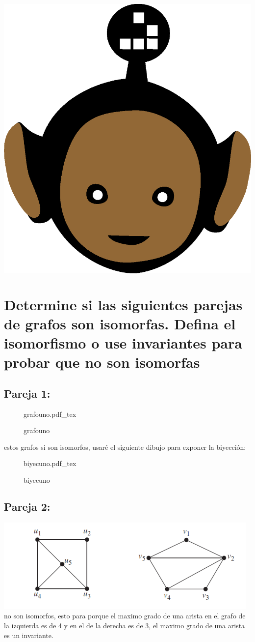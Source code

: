 \documentclass[10pt,a4paper]{article} %
\newcommand{\incfig}[1]{%
    \def\svgwidth{\columnwidth}
    {#1.pdf_tex}
}
\begin{document}
    \title{\rmfamily\normalfont{}}
    \author{}
    \date{\today}

    \maketitle


    \includegraphics[width=0.1\linewidth]{negro_cara.png}
    \section{Determine si las siguientes parejas de grafos son isomorfas.
    Defina el isomorfismo o use invariantes para probar que no son isomorfas}
        \subsection{Pareja 1:}
            \begin{figure}[h]
                \centering
                \incfig{grafouno}
                \caption{grafouno}
                \label{fig:grafouno}
            \end{figure}

            estos grafos si son isomorfos, usaré el siguiente dibujo para
            exponer la biyección:

            \begin{figure}[h]
                \centering
                \incfig{biyecuno}
                \caption{biyecuno}
                \label{fig:biyeccion 1}
            \end{figure}

        \subsection{Pareja 2:}
            \includegraphics[width=0.5\linewidth]{parej2.png}
            \\
            \color{teal}
            no son isomorfos, esto para porque el maximo grado de una arista en
            el grafo de la izquierda es de 4 y en el de la derecha es de 3, el
            maximo grado de una arista es un invariante.
            \color{black}
\end{document}
